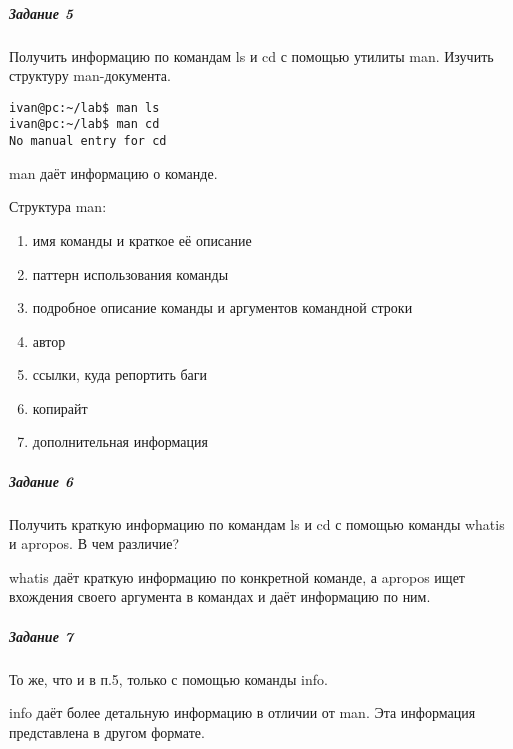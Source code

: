 \subparagraph{Задание 5}

Получить информацию по командам ls и cd с помощью утилиты man. Изучить
структуру man-документа.

\begin{verbatim}
ivan@pc:~/lab$ man ls
ivan@pc:~/lab$ man cd
No manual entry for cd
\end{verbatim}

man даёт информацию о команде.

Структура man:
\begin{enumerate}
    \item имя команды и краткое её описание
    \item паттерн использования команды
    \item подробное описание команды и аргументов командной строки
    \item автор
    \item ссылки, куда репортить баги
    \item копирайт
    \item дополнительная информация
\end{enumerate}

\subparagraph{Задание 6}

Получить краткую информацию по командам ls и cd с помощью команды
whatis и apropos. В чем различие?

whatis даёт краткую информацию по конкретной команде, 
а apropos ищет вхождения своего аргумента 
в командах и даёт информацию по ним.

\subparagraph{Задание 7}

То же, что и в п.5, только с помощью команды info.

info даёт более детальную информацию в отличии от man. Эта информация представлена
в другом формате.